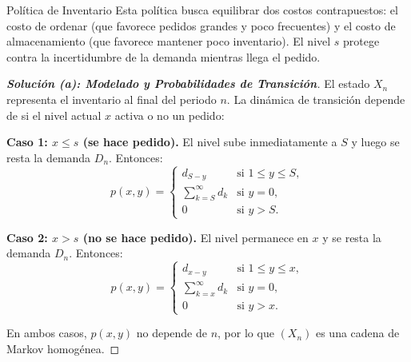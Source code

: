 \documentclass[10pt,a4paper]{article}
\begin{document}
\begin{nota}{Política de Inventario}
    Esta política busca equilibrar dos costos contrapuestos: el costo de ordenar (que favorece pedidos grandes y poco frecuentes) y el costo de almacenamiento (que favorece mantener poco inventario). El nivel $s$ protege contra la incertidumbre de la demanda mientras llega el pedido.
\end{nota}

\begin{proof}[\textbf{Solución (a): Modelado y Probabilidades de Transición}]
    El estado $X_n$ representa el inventario al final del periodo $n$. La dinámica de transición depende de si el nivel actual $x$ activa o no un pedido:

    \textbf{Caso 1: $x \le s$ (se hace pedido).} 
    El nivel sube inmediatamente a $S$ y luego se resta la demanda $D_n$. Entonces:
    \[
    p(x, y) =
    \begin{cases}
        d_{S-y} & \text{si } 1 \le y \le S, \\
        \sum_{k=S}^{\infty} d_k & \text{si } y = 0, \\
        0 & \text{si } y > S.
    \end{cases}
    \]

    \textbf{Caso 2: $x > s$ (no se hace pedido).} 
    El nivel permanece en $x$ y se resta la demanda $D_n$. Entonces:
    \[
    p(x, y) =
    \begin{cases}
        d_{x-y} & \text{si } 1 \le y \le x, \\
        \sum_{k=x}^{\infty} d_k & \text{si } y = 0, \\
        0 & \text{si } y > x.
    \end{cases}
    \]

    En ambos casos, $p(x,y)$ no depende de $n$, por lo que $(X_n)$ es una cadena de Markov homogénea.
\end{proof}

\vspace{5mm}
\end{document}
